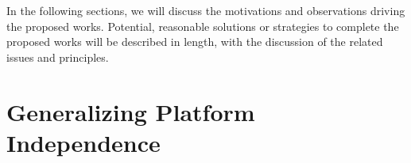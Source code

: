 


In the following sections, we will discuss the motivations and observations
driving the proposed works.
Potential, reasonable solutions or strategies
to complete the proposed works
will be described in length, with the discussion of the related issues and principles.


\section{Generalizing Platform Independence}
\label{sec:future:independence}

